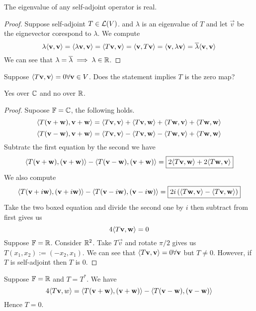 \begin{proposition}
	The eigenvalue of any self-adjoint operator is real.
\end{proposition}
\begin{proof}
Suppose self-adjoint $T \in \mathcal L(V)$. and $\lambda$ is an eigenvalue of $T$ and let $\vec v$ be the eignevector corespond to $\lambda$. We compute 
\[
	\lambda \langle \mathbf v, \mathbf v \rangle = \langle \lambda \mathbf v, \mathbf v \rangle 
	= \langle T\mathbf v, \mathbf v \rangle 
	= \langle \mathbf v, T\mathbf v \rangle 
	= \langle \mathbf v, \lambda \mathbf v \rangle 
	= \overline \lambda \langle \mathbf v, \mathbf v \rangle
\] We can see that $\lambda = \overline \lambda \implies \lambda \in \mathbb R$.
\end{proof}
\begin{question}
	Suppose $\langle T\mathbf v,\mathbf v \rangle = 0 \forall \mathbf v \in V$. Does the statement implies $T$ is the zero map?
\end{question}
\begin{answer}[Surprisingly]
	Yes over $\mathbb C$ and no over $\mathbb R$.
\end{answer}
\begin{proof}
	Supoose $\mathbb F = \mathbb C$, the following holds.
	\[ \langle T(\mathbf v + \mathbf w), \mathbf v + \mathbf w \rangle = \langle T\mathbf v, \mathbf v \rangle + \langle T\mathbf v, \mathbf w \rangle + \langle T\mathbf w,\mathbf v \rangle + \langle T\mathbf w, \mathbf w \rangle \]
	\[ \langle T(\mathbf v - \mathbf w), \mathbf v + \mathbf w \rangle = \langle T\mathbf v, \mathbf v \rangle - \langle T\mathbf v, \mathbf w \rangle - \langle T\mathbf w,\mathbf v \rangle + \langle T\mathbf w, \mathbf w \rangle \]
	Subtratc the first equation by the second we have 
	\[ \langle T(\mathbf v + \mathbf w), (\mathbf v + \mathbf w) \rangle - \langle T(\mathbf v - \mathbf w), (\mathbf v + \mathbf w) \rangle =\boxed{ 2\langle T\mathbf v, \mathbf w\rangle + 2\langle T\mathbf w, \mathbf v \rangle} \]
	We also compute 
	\[ \langle T(\mathbf v + i\mathbf w) , (\mathbf v + i\mathbf w)\rangle - \langle T(\mathbf v - i\mathbf w) , (\mathbf v - i\mathbf w)\rangle = \boxed{2i\left(\langle T\mathbf w, \mathbf v\rangle - \langle T\mathbf v, \mathbf w \rangle\right)}\]
	Take the two boxed equation and divide the second one by $i$ then subtract from first gives us 
	\[ 4\langle T \mathbf v, \mathbf w \rangle = 0\]
	Suppose $\mathbb F = \mathbb R$. Consider $\mathbb R^2$. Take $T\vec v$ and rotate $\pi / 2$ gives us $T(x_1, x_2) := (-x_2 , x_1)$. We can see that $\langle T\mathbf v, \mathbf v \rangle = 0 \forall \mathbf v$ but $T \neq 0$. However, if $T$ is self-adjoint then $T$ is $0$.
\end{proof}
\begin{remark}
	Suppose $\mathbb F = \mathbb R$ and $T = T^*$. We have 
	\[ 4\langle T\mathbf v, w \rangle = \langle T(\mathbf v + \mathbf w), (\mathbf v + \mathbf w) \rangle - \langle T(\mathbf v - \mathbf w), (\mathbf v - \mathbf w )\rangle\]
	Hence $T = 0$. 
\end{remark}

